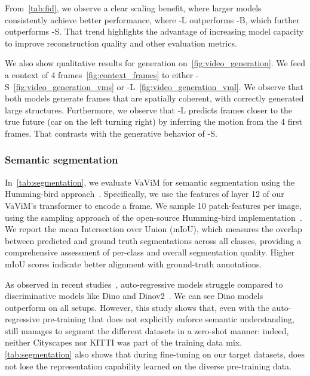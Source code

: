 From~\autoref{tab:fid}, we observe a clear scaling benefit, where larger models consistently achieve better performance, where \vm-L outperforms \vm-B, which further outperforms \vm-S. That trend highlights the advantage of increasing model capacity to improve reconstruction quality and other evaluation metrics.

We also show qualitative results for generation on~\autoref{fig:video_generation}. We feed a context of 4 frames~\autoref{fig:context_frames} to either \vm-S~\autoref{fig:video_generation_vms} or \vm-L~\autoref{fig:video_generation_vml}. We observe that both models generate frames that are spatially coherent, with correctly generated large structures. Furthermore, we observe that \vm-L predicts frames closer to the true future (car on the left turning right) by inferring the motion from the 4 first frames. That contrasts with the generative behavior of \vm-S.





\subsubsection{Semantic segmentation}


In~\autoref{tab:segmentation}, we evaluate VaViM for semantic segmentation using the Humming-bird approach~\cite{balazevic2023hummingbird}. Specifically, we use the features of layer 12 of our VaViM's transformer to encode a frame. We sample 10 patch-features per image, using the sampling approach of the open-source Humming-bird implementation~\cite{pariza2024hbird}. We report the mean Intersection over Union (mIoU), which measures the overlap between predicted and ground truth segmentations across all classes, providing a comprehensive assessment of per-class and overall segmentation quality. Higher mIoU scores indicate better alignment with ground-truth annotations.

As observed in recent studies~\cite{Empirical_autoregressive}, auto-regressive models struggle compared to discriminative models like Dino and Dinov2~\cite{Caron2021EmergingPI,oquab2024dinov2}. We can see Dino models outperform \vm on all setups. However, this study shows that, even with the auto-regressive pre-training that does not explicitly enforce semantic understanding, \vm still manages to segment the different datasets in a zero-shot manner: indeed, neither Cityscapes nor KITTI was part of the training data mix.
\autoref{tab:segmentation} also shows that during fine-tuning on our target datasets, \vm does not lose the representation capability learned on the diverse pre-training data.

